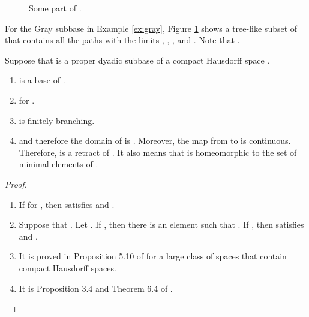 \documentclass{eptcs-modified}
\begin{document}
\begin{figure}
\begin{center}
\caption{Some part of . \label{fig:G}}
\end{center}
\end{figure}
\begin{example}
  For the Gray subbase  in Example \ref{ex:gray}, Figure \ref{fig:G} shows
 a tree-like subset of 
that contains
all the paths with the limits , , , and
.
Note that .
\end{example}



\begin{proposition}\label{prop:compact}
Suppose that  is a proper dyadic subbase of a compact Hausdorff space .
\begin{enumerate}
\item[(1)]  is a base of .

\item[(2)]  for .

\item[(3)]  is finitely branching.

 \item[(4)]
 and therefore
the domain of  is .  Moreover,
the map
 from  to  is continuous.
Therefore,  is a retract of .
It also means that
 is homeomorphic to the set of minimal elements of .
\end{enumerate}

\begin{proof}
\begin{enumerate}
\item[(1)] If  for , then  satisfies  and .

\item[(2)] Suppose that  .  Let .  If , then there is an element 
such that .  If , then  satisfies   and .

\item[(3)] It is proved in Proposition 5.10 of \cite{tsuiki4} for a large class of spaces that contain
compact Hausdorff spaces.

\item[(4)]  It is Proposition 3.4 and Theorem 6.4 of \cite{tsuiki4}.
\end{enumerate}
\end{proof}
\end{proposition}
\end{document}
